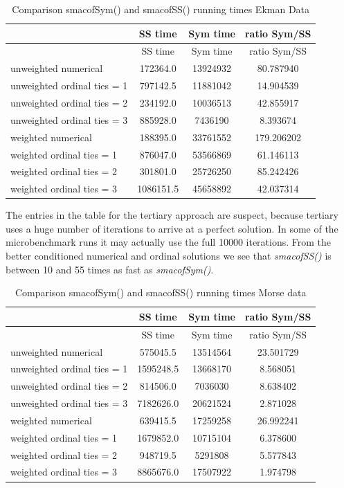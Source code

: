 \documentclass[
  12pt,
  letterpaper,
  DIV=11,
  numbers=noendperiod]{scrartcl}
\begin{document}
\begin{longtable}[]{@{}lccc@{}}
\caption{Comparison smacofSym() and smacofSS() running times Ekman
Data}\tabularnewline
\toprule\noalign{}
& SS time & Sym time & ratio Sym/SS \\
\midrule\noalign{}
\endfirsthead
\toprule\noalign{}
& SS time & Sym time & ratio Sym/SS \\
\midrule\noalign{}
\endhead
\bottomrule\noalign{}
\endlastfoot
unweighted numerical & 172364.0 & 13924932 & 80.787940 \\
unweighted ordinal ties = 1 & 797142.5 & 11881042 & 14.904539 \\
unweighted ordinal ties = 2 & 234192.0 & 10036513 & 42.855917 \\
unweighted ordinal ties = 3 & 885928.0 & 7436190 & 8.393674 \\
weighted numerical & 188395.0 & 33761552 & 179.206202 \\
weighted ordinal ties = 1 & 876047.0 & 53566869 & 61.146113 \\
weighted ordinal ties = 2 & 301801.0 & 25726250 & 85.242426 \\
weighted ordinal ties = 3 & 1086151.5 & 45658892 & 42.037314 \\
\end{longtable}

The entries in the table for the tertiary approach are suspect, because
tertiary uses a huge number of iterations to arrive at a perfect
solution. In some of the microbenchmark runs it may actually use the
full 10000 iterations. From the better conditioned numerical and ordinal
solutions we see that \emph{smacofSS()} is between 10 and 55 times as
fast as \emph{smacofSym()}.

\begin{longtable}[]{@{}lccc@{}}
\caption{Comparison smacofSym() and smacofSS() running times Morse
data}\tabularnewline
\toprule\noalign{}
& SS time & Sym time & ratio Sym/SS \\
\midrule\noalign{}
\endfirsthead
\toprule\noalign{}
& SS time & Sym time & ratio Sym/SS \\
\midrule\noalign{}
\endhead
\bottomrule\noalign{}
\endlastfoot
unweighted numerical & 575045.5 & 13514564 & 23.501729 \\
unweighted ordinal ties = 1 & 1595248.5 & 13668170 & 8.568051 \\
unweighted ordinal ties = 2 & 814506.0 & 7036030 & 8.638402 \\
unweighted ordinal ties = 3 & 7182626.0 & 20621524 & 2.871028 \\
weighted numerical & 639415.5 & 17259258 & 26.992241 \\
weighted ordinal ties = 1 & 1679852.0 & 10715104 & 6.378600 \\
weighted ordinal ties = 2 & 948719.5 & 5291808 & 5.577843 \\
weighted ordinal ties = 3 & 8865676.0 & 17507922 & 1.974798 \\
\end{longtable}
\end{document}
